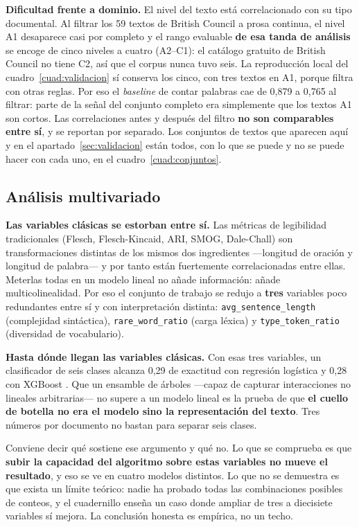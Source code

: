 \documentclass[11pt,a4paper]{article}
\newcommand{\cod}[1]{\texttt{\small #1}}
\begin{document}
\textbf{Dificultad frente a dominio.} El nivel del texto está correlacionado con su tipo
documental. Al filtrar los 59 textos de British Council a prosa continua, el nivel A1
desaparece casi por completo y el rango evaluable \textbf{de esa tanda de análisis} se
encoge de cinco niveles a cuatro (A2--C1): el catálogo gratuito de British Council no
tiene C2, así que el corpus nunca tuvo seis. La reproducción local del
cuadro~\ref{cuad:validacion} sí conserva los cinco, con tres textos en A1, porque
filtra con otras reglas. Por eso el \emph{baseline} de contar palabras cae de 0,879 a 0,765 al filtrar:
parte de la señal del conjunto completo era simplemente que los textos A1 son cortos.
Las correlaciones antes y después del filtro \textbf{no son comparables entre sí}, y se
reportan por separado. Los conjuntos de textos que aparecen aquí y en el
apartado~\ref{sec:validacion} están todos, con lo que se puede y no se puede hacer con cada
uno, en el cuadro~\ref{cuad:conjuntos}.

\subsection{Análisis multivariado}

\textbf{Las variables clásicas se estorban entre sí.} Las métricas de legibilidad
tradicionales (Flesch, Flesch-Kincaid, ARI, SMOG, Dale-Chall) son transformaciones
distintas de los mismos dos ingredientes —longitud de oración y longitud de palabra— y
por tanto están fuertemente correlacionadas entre ellas. Meterlas todas en un modelo
lineal no añade información: añade multicolinealidad. Por eso el conjunto de trabajo se
redujo a \textbf{tres} variables poco redundantes entre sí y con interpretación
distinta: \cod{avg\_sentence\_length} (complejidad sintáctica),
\cod{rare\_word\_ratio} (carga léxica) y \cod{type\_token\_ratio} (diversidad de
vocabulario).

\textbf{Hasta dónde llegan las variables clásicas.} Con esas tres variables, un
clasificador de seis clases alcanza 0,29 de exactitud con regresión logística
\parencite{pedregosa2011scikit} y 0,28 con XGBoost \parencite{chen2016xgboost}. Que un
ensamble de árboles —capaz de capturar interacciones no lineales arbitrarias— no supere
a un modelo lineal es la prueba de que \textbf{el cuello de botella no era el modelo sino
la representación del texto}. Tres números por documento no bastan para separar seis
clases.

Conviene decir qué sostiene ese argumento y qué no. Lo que se comprueba es que
\textbf{subir la capacidad del algoritmo sobre estas variables no mueve el resultado}, y
eso se ve en cuatro modelos distintos. Lo que no se demuestra es que exista un límite
teórico: nadie ha probado todas las combinaciones posibles de conteos, y el cuadernillo
enseña un caso donde ampliar de tres a diecisiete variables sí mejora. La conclusión
honesta es empírica, no un techo.
\end{document}
